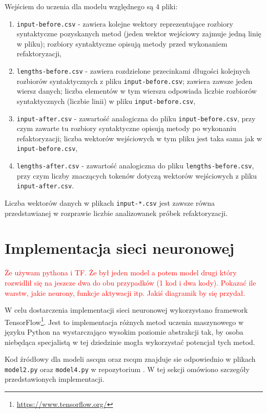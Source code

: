 \documentclass[12pt]{report}
\begin{document}
Wejściem do uczenia dla modelu względnego są 4 pliki:

\begin{enumerate}
\item \texttt{input-before.csv} - zawiera kolejne wektory reprezentujące rozbiory syntaktyczne pozyskanych metod (jeden wektor wejściowy zajmuje jedną linię w pliku); rozbiory syntaktyczne opisują metody przed wykonaniem refaktoryzacji,
\item \texttt{lengths-before.csv} - zawiera rozdzielone przecinkami długości kolejnych rozbiorów syntaktycznych z pliku \texttt{input-before.csv}; zawiera zawsze jeden wiersz danych; liczba elementów w tym wierszu odpowiada liczbie rozbiorów syntaktycznych (liczbie linii) w pliku \texttt{input-before.csv},
\item \texttt{input-after.csv} - zawartość analogiczna do pliku \texttt{input-before.csv}, przy czym zawarte tu rozbiory syntaktyczne opisują metody po wykonaniu refaktoryzacji; liczba wektorów wejściowych w tym pliku jest taka sama jak w \texttt{input-before.csv},
\item \texttt{lengths-after.csv} - zawartość analogiczna do pliku \texttt{lengths-before.csv}, przy czym liczby znaczących tokenów dotyczą wektorów wejściowych z pliku \texttt{input-after.csv}.
\end{enumerate}

Liczba wektorów danych w plikach \texttt{input-*.csv} jest zawsze równa przedstawianej w rozprawie liczbie analizowanek próbek refaktoryzacji.

\section{Implementacja sieci neuronowej}
\label{sec:impl:rnn}
\textcolor{red}{Że używam pythona i TF. Że był jeden model a potem model drugi który rozwidlił się na jeszcze dwa do obu przypadków (1 kod i dwa kody). Pokazać ile warstw, jakie neurony, funkcje aktywacji itp. Jakiś diagramik by się przydał.}

W celu dostarczenia implementacji sieci neuronowej wykorzystano framework TensorFlow\footnote{\url{https://www.tensorflow.org/}}. Jest to implementacja różnych metod uczenia maszynowego w języku Python na wystarczająco wysokim poziomie abstrakcji tak, by osoba niebędąca specjalistą w tej dziedzinie mogła wykorzystać potencjał tych metod.

Kod źródłowy dla modeli \gls{ascqm} oraz \gls{rscqm} znajduje sie odpowiednio w plikach \texttt{model2.py} oraz \texttt{model4.py} w repozytorium \cite{fracz:code-quality-tf}. W tej sekcji omówiono szczegóły przedstawionych implementacji.
\end{document}
